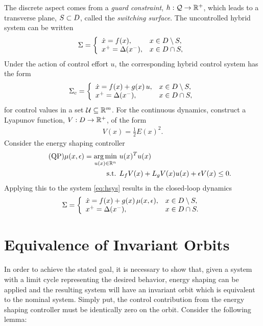 The discrete aspect comes from a {\em guard constraint}, $h : \mathcal{Q} \to \mathbb{R}^{+}$, which leads to a transverse plane, $S \subset D$, called the {\em switching surface}.
%
The uncontrolled hybrid system can be written
\begin{align}
  \Sigma = \left\{
  \begin{array}{l l}
    {\dot x} = f(x), & x \in D \setminus S,\\
    x^{+} = \Delta(x^{-}), &x \in D \cap S,
  \end{array}\right.
  \label{eq:hsys}
\end{align}
Under the action of control effort $u$, the corresponding hybrid control system has the form
\begin{align}
  \Sigma_{c} = \left\{
  \begin{array}{l l}
    {\dot x} = f(x) + g(x) \, u, & x \in D \setminus S,\\
    x^{+} = \Delta(x^{-}), &x \in D \cap S,
  \end{array}\right.
  \label{eq:csys}
\end{align}
for control values in a set $\mathcal{U} \subseteq \mathbb{R}^{m}$.
%
For the continuous dynamics, construct a Lyapunov function, $V : D \to \mathbb{R}^{+}$, of the form
\begin{align}
  \label{eq:lyap}
  V(x) = \frac{1}{2} E(x)^2.
\end{align}
Consider the energy shaping controller
\begin{align}
  \label{eq:es-qp} \tag {QP}
  \mu(x, \epsilon) = \operatorname*{arg\,min}_{u(x) \in \mathbb{R}^{n}} \ & u(x)^T u(x)\\
  \nonumber
  \mbox{s.t. } & L_{f} V(x) + L_{g} V(x) u(x) + \epsilon V(x) \leq 0.
\end{align}
Applying this to the system \eqref{eq:hsys} results in the closed-loop dynamics
\begin{align}
  \label{eq:hsys-cl}
  \Sigma = \left\{
  \begin{array}{l l}
    {\dot x} = f(x) + g(x) \, \mu(x, \epsilon), & x \in D \setminus S,\\
    x^{+} = \Delta(x^{-}), &x \in D \cap S.
  \end{array}\right.
\end{align}

\section*{Equivalence of Invariant Orbits}
In order to achieve the stated goal, it is necessary to show that, given a system with a limit cycle representing the desired behavior, energy shaping can be applied and the resulting system will have an invariant orbit which is equivalent to the nominal system. Simply put, the control contribution from the energy shaping controller must be identically zero on the orbit. Consider the following lemma:

